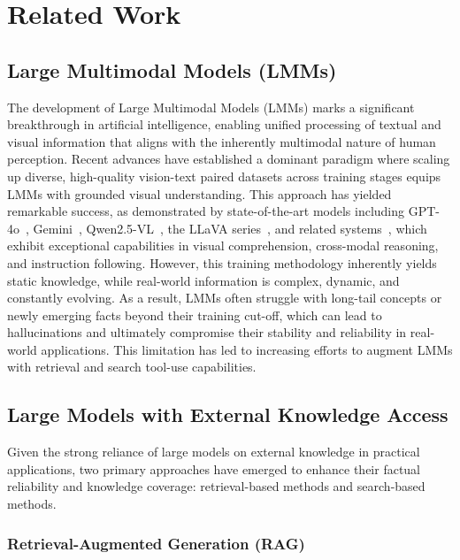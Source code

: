 \documentclass{article}
\begin{document}
\newpage



\newpage
\appendix
\section{Related Work}
\subsection{Large Multimodal Models (LMMs)}
The development of Large Multimodal Models (LMMs) marks a significant breakthrough in artificial intelligence, enabling unified processing of textual and visual information that aligns with the inherently multimodal nature of human perception. Recent advances have established a dominant paradigm where scaling up diverse, high-quality vision-text paired datasets across training stages equips LMMs with grounded visual understanding. This approach has yielded remarkable success, as demonstrated by state-of-the-art models including GPT-4o~\cite{lmm/gpt4o}, Gemini~\cite{lmm/gemini}, Qwen2.5-VL~\cite{lmm/qw25vl}, the LLaVA series~\cite{lmm/llava,lmm/llava-ov,lmm/llava-video}, and related systems~\cite{lmm/claude-3.5,lmm/llama-3.2,lmm/aira,lmm/internvl,lmm/vila}, which exhibit exceptional capabilities in visual comprehension, cross-modal reasoning, and instruction following. However, this training methodology inherently yields static knowledge, while real-world information is complex, dynamic, and constantly evolving. As a result, LMMs often struggle with long-tail concepts or newly emerging facts beyond their training cut-off, which can lead to hallucinations and ultimately compromise their stability and reliability in real-world applications. This limitation has led to increasing efforts to augment LMMs with retrieval and search tool-use capabilities.

\subsection{Large Models with External Knowledge Access}
Given the strong reliance of large models on external knowledge in practical applications, two primary approaches have emerged to enhance their factual reliability and knowledge coverage: retrieval-based methods and search-based methods. 

\subsubsection{Retrieval-Augmented Generation (RAG)}
\end{document}
